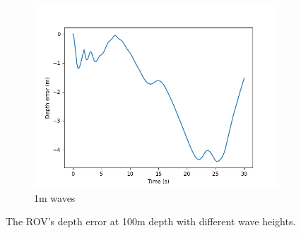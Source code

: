 \documentclass[class=article, crop=false]{standalone}
\begin{document}
\begin{figure}
\begin{subfigure}{0.65\textwidth}
        \includegraphics{scenario1/rov-100m/1.0m/rov_depth_error_controlled}
        \caption{1m waves}
        \label{fig:position_controlled_1m}
    \end{subfigure}
    \vfill
    \caption{The ROV's depth error at 100m depth with different wave heights.}
    \label{fig:rov_depth_error_controlled}
\end{figure}
\end{document}
